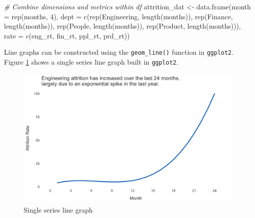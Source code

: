 \documentclass[
]{book}
\newenvironment{Shaded}{\begin{snugshade}}{\end{snugshade}}
\newcommand{\AttributeTok}[1]{\textcolor[rgb]{0.77,0.63,0.00}{#1}}
\newcommand{\CommentTok}[1]{\textcolor[rgb]{0.56,0.35,0.01}{\textit{#1}}}
\newcommand{\DecValTok}[1]{\textcolor[rgb]{0.00,0.00,0.81}{#1}}
\newcommand{\FunctionTok}[1]{\textcolor[rgb]{0.00,0.00,0.00}{#1}}
\newcommand{\NormalTok}[1]{#1}
\newcommand{\OtherTok}[1]{\textcolor[rgb]{0.56,0.35,0.01}{#1}}
\newcommand{\StringTok}[1]{\textcolor[rgb]{0.31,0.60,0.02}{#1}}
\begin{document}
\begin{Shaded}
\begin{Highlighting}[]
\CommentTok{\# Combine dimensions and metrics within df}
\NormalTok{attrition\_dat }\OtherTok{\textless{}{-}} \FunctionTok{data.frame}\NormalTok{(}\AttributeTok{month =} \FunctionTok{rep}\NormalTok{(months, }\DecValTok{4}\NormalTok{),}
                            \AttributeTok{dept =} \FunctionTok{c}\NormalTok{(}\FunctionTok{rep}\NormalTok{(}\StringTok{\textquotesingle{}Engineering\textquotesingle{}}\NormalTok{, }\FunctionTok{length}\NormalTok{(months)), }
                                     \FunctionTok{rep}\NormalTok{(}\StringTok{\textquotesingle{}Finance\textquotesingle{}}\NormalTok{, }\FunctionTok{length}\NormalTok{(months)),}
                                     \FunctionTok{rep}\NormalTok{(}\StringTok{\textquotesingle{}People\textquotesingle{}}\NormalTok{, }\FunctionTok{length}\NormalTok{(months)),}
                                     \FunctionTok{rep}\NormalTok{(}\StringTok{\textquotesingle{}Product\textquotesingle{}}\NormalTok{, }\FunctionTok{length}\NormalTok{(months))),}
                            \AttributeTok{rate =} \FunctionTok{c}\NormalTok{(eng\_rt,}
\NormalTok{                                     fin\_rt,}
\NormalTok{                                     ppl\_rt,}
\NormalTok{                                     prd\_rt))}
\end{Highlighting}
\end{Shaded}

Line graphs can be constructed using the \texttt{geom\_line()} function in \texttt{ggplot2}. Figure \ref{fig:single-line-graph} shows a single series line graph built in \texttt{ggplot2}.

\begin{figure}

{\centering \includegraphics[width=1\linewidth]{graphics/line_graph_single} 

}

\caption{Single series line graph}\label{fig:single-line-graph}
\end{figure}
\end{document}
